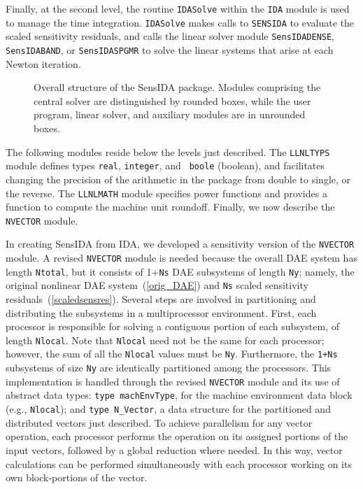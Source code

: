 Finally, at the second level, the routine {\tt IDASolve} within the
{\tt IDA} module is used to manage the time integration.
{\tt IDASolve} makes calls to {\tt SENSIDA} to evaluate the scaled
sensitivity residuals, and calls the linear solver module
{\tt SensIDADENSE}, {\tt SensIDABAND}, or {\tt SensIDASPGMR} to solve the linear
systems that arise at each Newton iteration.

\begin{figure}[p]
\vspace{2.0in}
\caption{Overall structure of the SensIDA package.
Modules comprising the central solver are distinguished by rounded
boxes, while the user program, linear solver, and auxiliary
modules are in unrounded boxes.} 
\label{fig-sensidaorg}
\end{figure}

The following modules reside below the levels just described.
The {\tt LLNLTYPS} module defines types {\tt real}, {\tt integer}, and {\tt
boole} (boolean), and facilitates changing the precision of the
arithmetic in the package from double to single, or the reverse.
The {\tt LLNLMATH} module specifies power functions and provides a function
to compute the machine unit roundoff.
Finally, we now describe the {\tt NVECTOR} module.

In creating SensIDA from IDA, we developed a sensitivity
version of the {\tt NVECTOR} module.
A revised {\tt NVECTOR} module is needed because the overall DAE
system has length {\tt Ntotal}, but it consists of 1+{\tt Ns}
DAE subsystems of length {\tt Ny};
namely, the original nonlinear DAE system~(\ref{orig_DAE}) and
{\tt Ns} scaled sensitivity residuals~(\ref{scaledsensres}).
Several steps are involved in partitioning and distributing
the subsystems in a multiprocessor environment.
First, each processor is responsible for solving a contiguous portion
of each subsystem, of length {\tt Nlocal}.
Note that {\tt Nlocal} need not be the same for each processor;
however, the sum of all the {\tt Nlocal} values must be {\tt Ny}.
Furthermore, the {\tt 1+Ns} subsystems of size {\tt Ny} are
identically partitioned among the processors.
This implementation is handled through the revised {\tt NVECTOR}
module and its use of abstract data types: 
{\tt type machEnvType}, for the machine environment data block (e.g.,
{\tt Nlocal}); and
{\tt type N\_Vector}, a data structure for the partitioned and
distributed vectors just described.
To achieve parallelism for any vector operation, each processor
performs the operation on its assigned portions of the input vectors,
followed by a global reduction where needed.
In this way, vector calculations can be performed simultaneously with
each processor working on its own block-portions of the vector.

